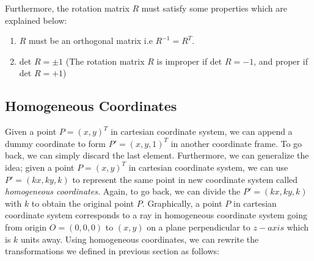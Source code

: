 \documentclass{book}
\begin{document}
\begin{enumerate}
                    Furthermore, the rotation matrix $R$ must satisfy some properties which are explained below: 
                    \begin{enumerate}
                        \item $R$ must be an orthogonal matrix i.e $R^{-1} = R^{T}$. 
                        \item det $R = \pm 1$ (The rotation matrix $R$ is improper if det $R = -1$, and proper if det $R = +1$)
                    \end{enumerate} 
                \end{enumerate}

            \subsection{Homogeneous Coordinates}
                Given a point $P = (x,y)^{T}$ in cartesian coordinate system, we can append a dummy coordinate to form $P' = (x,y,1)^{T}$
                in another coordinate frame. To go back, we can simply discard the last element. Furthermore, we can generalize the idea;
                given a point $P = (x,y)^{T}$ in cartesian coordinate system, we can use $P' = (kx, ky, k)$ to represent the same point in 
                new coordinate system called \textit{homogeneous coordinates.} Again, to go back, we can divide the $P'=(kx,ky,k)$ with $k$
                to obtain the original point $P$. Graphically, a point $P$ in cartesian coordinate system corresponds to a ray in homogeneous 
                coordinate system going from origin $O = (0,0,0)$ to $(x,y)$ on a plane perpendicular to $z-axis$ which is $k$ units away.
                Using homogeneous coordinates, we can rewrite the transformations we defined in previous 
                section as follows: 
\end{document}
